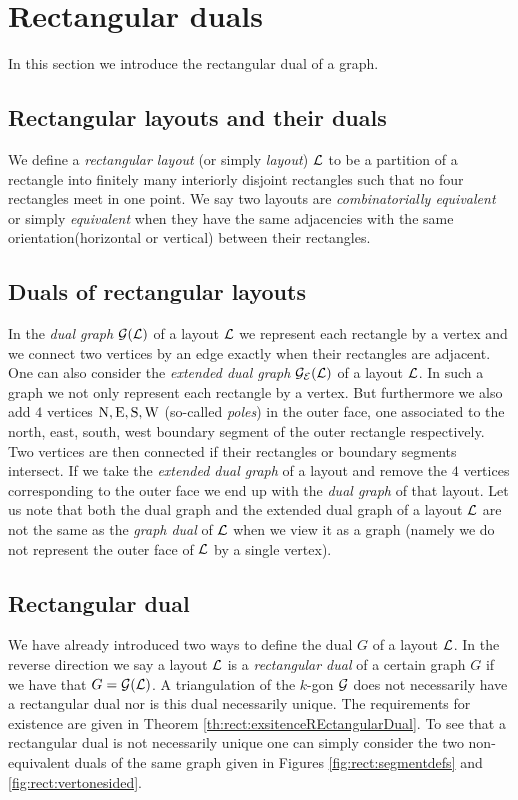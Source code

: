 
\section{Rectangular duals}
\newcommand{\G}{\scr G}
\renewcommand{\L}{\scr L}

In this section we  introduce the rectangular dual of a graph.

\subsection{Rectangular layouts and their duals}
  We define a \emph{rectangular layout} (or simply \emph{layout}) $\L$ to be a partition of a rectangle into finitely many interiorly disjoint rectangles such that no four rectangles meet in one point.
  We say two layouts are  \emph{combinatorially equivalent} or simply \emph{equivalent} when they have the same adjacencies with the same orientation(horizontal or vertical) between their rectangles.

\subsection{Duals of rectangular layouts}
  In the \emph{dual graph} $\dualgraph{\L}$ of a layout $\L$ we represent each rectangle by a vertex and we connect two vertices by an edge exactly when their rectangles are adjacent.
  One can also consider the \emph{extended dual graph} $\extdualgraph{\L}$ of a layout $\L$. In such a graph we not only represent each rectangle by a vertex. But furthermore we also add $4$ vertices $\mathrm{N}, \mathrm{E}, \mathrm{S}, \mathrm{W}$ (so-called \emph{poles}) in the outer face, one associated to the north, east, south, west boundary segment of the outer rectangle respectively. Two vertices are then connected if their rectangles or boundary segments intersect.
  If we take the \emph{extended dual graph} of a layout and remove the $4$ vertices corresponding to the outer face we end up with the \emph{dual graph} of that layout.
  Let us note that both the dual graph and the extended dual graph of a layout $\L$ are not the same as the \emph{graph dual} of $\L$ when we view it as a graph (namely we do not represent the outer face of $\L$ by a single vertex).

\subsection{Rectangular dual}
  We have already introduced two ways to define the dual $G$ of a layout $\L$. In the reverse direction we say a layout $\L$ is a \emph{rectangular dual} of a certain graph $G$ if we have that $G = \dualgraph{\L}$.
  A triangulation of the $k$-gon $\G$ does not necessarily have a rectangular dual nor is this dual necessarily unique. The requirements for existence are given in Theorem \ref{th:rect:exsitenceREctangularDual}.
  To see that a rectangular  dual is not necessarily unique one can simply consider the two non-equivalent duals of the same graph given in Figures \ref{fig:rect:segmentdefs} and \ref{fig:rect:vertonesided}.



